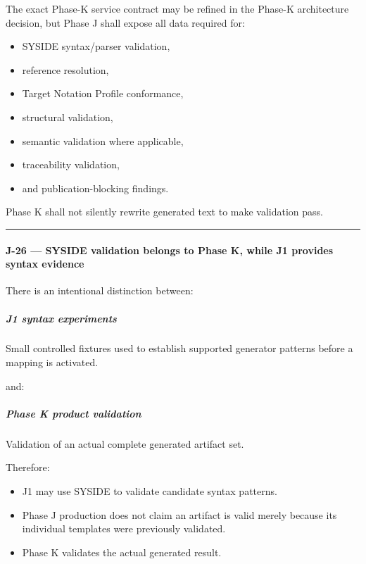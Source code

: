 The exact Phase-K service contract may be refined in the Phase-K architecture decision, but Phase J shall expose all data required for:

\begin{itemize}
\tightlist
\item
  SYSIDE syntax/parser validation,
\item
  reference resolution,
\item
  Target Notation Profile conformance,
\item
  structural validation,
\item
  semantic validation where applicable,
\item
  traceability validation,
\item
  and publication-blocking findings.
\end{itemize}

Phase K shall not silently rewrite generated text to make validation pass.

\begin{center}\rule{0.5\linewidth}{0.5pt}\end{center}

\hypertarget{j-26--syside-validation-belongs-to-phase-k-while-j1-provides-syntax-evidence}{%
\paragraph{J-26 --- SYSIDE validation belongs to Phase K, while J1 provides syntax evidence}\label{j-26--syside-validation-belongs-to-phase-k-while-j1-provides-syntax-evidence}}

There is an intentional distinction between:

\hypertarget{j1-syntax-experiments}{%
\subparagraph{J1 syntax experiments}\label{j1-syntax-experiments}}

Small controlled fixtures used to establish supported generator patterns before a mapping is activated.

and:

\hypertarget{phase-k-product-validation}{%
\subparagraph{Phase K product validation}\label{phase-k-product-validation}}

Validation of an actual complete generated artifact set.

Therefore:

\begin{itemize}
\tightlist
\item
  J1 may use SYSIDE to validate candidate syntax patterns.
\item
  Phase J production does not claim an artifact is valid merely because its individual templates were previously validated.
\item
  Phase K validates the actual generated result.
\end{itemize}

